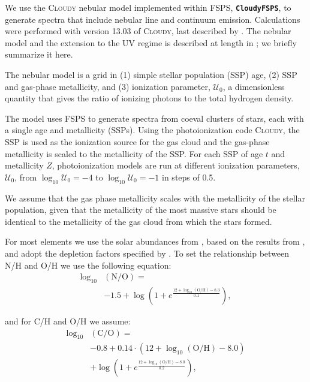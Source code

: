 \documentclass[preprint2]{aastex62}
\newcommand{\FSPS}{{\sc FSPS}\xspace}
\newcommand{\CloudyFSPS}{{\tt \textbf{CloudyFSPS}}\xspace}
\newcommand{\Cloudy}{\textsc{Cloudy}\xspace}
\newcommand{\logten}{\ensuremath{\log_{10}}}
\newcommand{\U}{\ensuremath{\mathcal{U}_{0}}\xspace}
\newcommand{\logUeq}[1]{\ensuremath{\logten \mathcal{U}_0 = #1}}
\begin{document}
We use the \Cloudy nebular model implemented within \FSPS, \CloudyFSPS \citep{cloudyFSPSv1}, to generate spectra that include nebular line and continuum emission. Calculations were performed with version 13.03 of \Cloudy, last described by \citet{Ferland+2013}. The nebular model and the extension to the UV regime is described at length in \citet{Byler+2018}; we briefly summarize it here.

The nebular model is a grid in (1) simple stellar population (SSP) age, (2) SSP and gas-phase metallicity, and (3) ionization parameter, \U, a dimensionless quantity that gives the ratio of ionizing photons to the total hydrogen density.

The model uses \FSPS to generate spectra from coeval clusters of stars, each with a single age and metallicity (SSPs). Using the photoionization code \Cloudy, the SSP is used as the ionization source for the gas cloud and the gas-phase metallicity is scaled to the metallicity of the SSP. For each SSP of age $t$ and metallicity $Z$, photoionization models are run at different ionization parameters, \U, from \logUeq{-4} to \logUeq{-1} in steps of 0.5. 

We assume that the gas phase metallicity scales with the metallicity of the stellar population, given that the metallicity of the most massive stars should be identical to the metallicity of the gas cloud from which the stars formed. 

For most elements we use the solar abundances from \citet{Grevesse+2010}, based on the results from \citet{Asplund+2009}, and adopt the depletion factors specified by \citet{Dopita+2013}. To set the relationship between N/H and O/H we use the following equation:
\begin{equation}\label{eq:nitrogen}
\begin{aligned}
    \log_{10}&(\mathrm{N}/\mathrm{O}) = \\
    & -1.5 + \log\left( 1 + e^{\frac{12 + \log_{10}(\mathrm{O}/\mathrm{H})-8.3}{0.1}}\right),
\end{aligned}
\end{equation}

and for C/H and O/H we assume:
\begin{equation}\label{eq:carbon}
\begin{aligned}
    \log_{10}&(\mathrm{C}/\mathrm{O}) = \\
    & -0.8 + 0.14\cdot\left(12 + \log_{10}(\mathrm{O}/\mathrm{H})-8.0\right) \\
    & + \log\left( 1 + e^{\frac{12 + \log_{10}(\mathrm{O}/\mathrm{H})-8.0}{0.2}}\right),
\end{aligned}
\end{equation}
\end{document}

